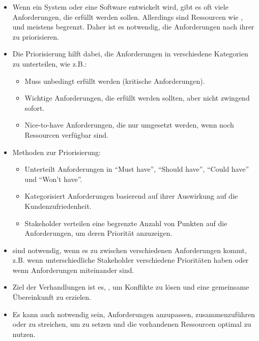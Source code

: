 \begin{infoBox}[title=Requirements Prioritization (Anforderungen priorisieren)]
    \begin{itemize}
        \item Wenn ein System oder eine Software entwickelt wird, gibt es oft viele Anforderungen, die erfüllt werden sollen. Allerdings sind Ressourcen wie ,  und  meistens begrenzt. Daher ist es notwendig, die Anforderungen nach ihrer  zu priorisieren.
        \item Die Priorisierung hilft dabei, die Anforderungen in verschiedene Kategorien zu unterteilen, wie z.B.:
        \begin{itemize}
            \item {} Muss unbedingt erfüllt werden (kritische Anforderungen).
            \item {} Wichtige Anforderungen, die erfüllt werden sollten, aber nicht zwingend sofort.
            \item {} Nice-to-have Anforderungen, die nur umgesetzt werden, wenn noch Ressourcen verfügbar sind.
        \end{itemize}
        \item Methoden zur Priorisierung:
        \begin{itemize}
            \item {} Unterteilt Anforderungen in \enquote{Must have}, \enquote{Should have}, \enquote{Could have} und \enquote{Won't have}.
            \item {} Kategorisiert Anforderungen basierend auf ihrer Auswirkung auf die Kundenzufriedenheit.
            \item {} Stakeholder verteilen eine begrenzte Anzahl von Punkten auf die Anforderungen, um deren Priorität anzuzeigen.
        \end{itemize}
    \end{itemize}
\end{infoBox}
\begin{infoBox}[title=Requirements Negotiation (Anforderungen verhandeln)]
    \begin{itemize}
        \item {} sind notwendig, wenn es zu  zwischen verschiedenen Anforderungen kommt, z.B. wenn unterschiedliche Stakeholder verschiedene Prioritäten haben oder wenn Anforderungen miteinander  sind.
        \item Ziel der Verhandlungen ist es, , um Konflikte zu lösen und eine gemeinsame Übereinkunft zu erzielen.
        \item Es kann auch notwendig sein, Anforderungen anzupassen, zusammenzuführen oder zu streichen, um  zu setzen und die vorhandenen Ressourcen optimal zu nutzen.
    \end{itemize}
\end{infoBox}
